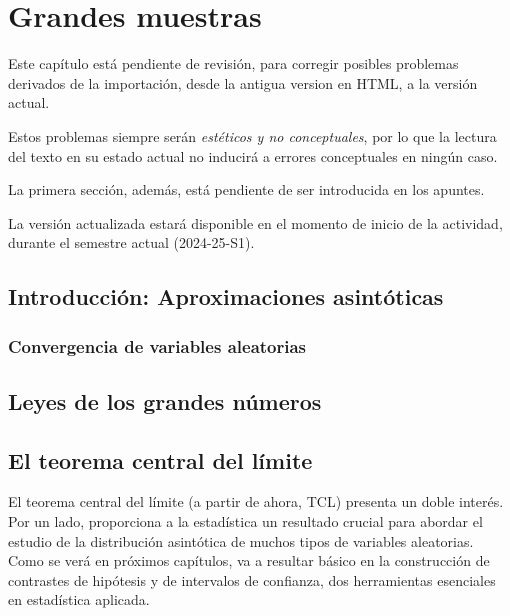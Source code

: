 \documentclass[
  a4paper,
  DIV=11,
  numbers=noendperiod]{scrreprt}
\begin{document}

\chapter{Grandes muestras}\label{grandes-muestras}

Este capítulo está pendiente de revisión, para corregir posibles
problemas derivados de la importación, desde la antigua version en HTML,
a la versión actual.

Estos problemas siempre serán \emph{estéticos y no conceptuales}, por lo
que la lectura del texto en su estado actual no inducirá a errores
conceptuales en ningún caso.

La primera sección, además, está pendiente de ser introducida en los
apuntes.

La versión actualizada estará disponible en el momento de inicio de la
actividad, durante el semestre actual (2024-25-S1).

\section{Introducción: Aproximaciones
asintóticas}\label{introducciuxf3n-aproximaciones-asintuxf3ticas}

\subsection{Convergencia de variables
aleatorias}\label{convergencia-de-variables-aleatorias}

\section{Leyes de los grandes
números}\label{leyes-de-los-grandes-nuxfameros}

\section{El teorema central del
límite}\label{el-teorema-central-del-luxedmite}

El teorema central del límite (a partir de ahora, TCL) presenta un doble
interés. Por un lado, proporciona a la estadística un resultado crucial
para abordar el estudio de la distribución asintótica de muchos tipos de
variables aleatorias. Como se verá en próximos capítulos, va a resultar
básico en la construcción de contrastes de hipótesis y de intervalos de
confianza, dos herramientas esenciales en estadística aplicada.
\end{document}
